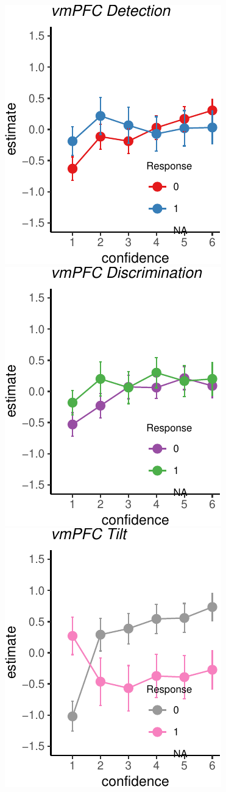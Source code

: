 \documentclass[]{article}
\begin{document}
\includegraphics{Chudi-Thesis_files/figure-latex/mixed_effects-4.pdf}
\includegraphics{Chudi-Thesis_files/figure-latex/mixed_effects-5.pdf}
\includegraphics{Chudi-Thesis_files/figure-latex/mixed_effects-6.pdf}
\end{document}
